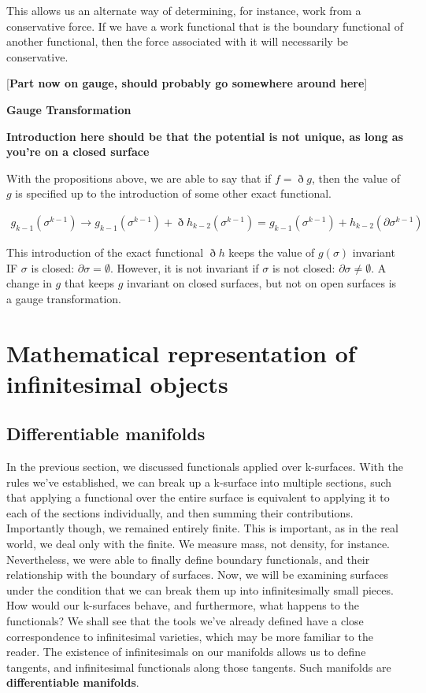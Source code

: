 \documentclass{book}
\begin{document}
This allows us an alternate way of determining, for instance, work from a conservative force. If we have a work functional that is the boundary functional of another functional, then the force associated with it will necessarily be conservative.

[\textbf{Part now on gauge, should probably go somewhere around here}]


\textbf{Gauge Transformation}

\textbf{Introduction here should be that the potential is not unique, as long as you're on a closed surface}

With the propositions above, we are able to say that if $f = \eth g$, then the value of $g$ is specified up to the introduction of some other exact functional. 

\begin{gather} 
g_{k-1}(\sigma^{k-1}) \to g_{k-1}(\sigma^{k-1}) + \eth h_{k-2}(\sigma^{k-1}) = g_{k-1}(\sigma^{k-1}) + h_{k-2}(\partial\sigma^{k-1})
\end{gather}



This introduction of the exact functional $\eth h$ keeps the value of $g(\sigma)$ invariant IF $\sigma$ is closed: $\partial\sigma = \emptyset$. However, it is not invariant if $\sigma$ is not closed: $\partial\sigma \neq \emptyset$. A change in $g$ that keeps $g$ invariant on closed surfaces, but not on open surfaces is a gauge transformation. 



\chapter{Mathematical representation of infinitesimal objects}



\section{Differentiable manifolds}



In the previous section, we discussed functionals applied over k-surfaces. With the rules we've established, we can break up a k-surface into multiple sections, such that applying a functional over the entire surface is equivalent to applying it to each of the sections individually, and then summing their contributions. Importantly though, we remained entirely finite. This is important, as in the real world, we deal only with the finite. We measure mass, not density, for instance. Nevertheless, we were able to finally define boundary functionals, and their relationship with the boundary of surfaces. Now, we will be examining surfaces under the condition that we can break them up into infinitesimally small pieces. How would our k-surfaces behave, and furthermore, what happens to the functionals? We shall see that the tools we've already defined have a close correspondence to infinitesimal varieties, which may be more familiar to the reader. The existence of infinitesimals on our manifolds allows us to define tangents, and infinitesimal functionals along those tangents. Such manifolds are \textbf{differentiable manifolds}. 
\end{document}

